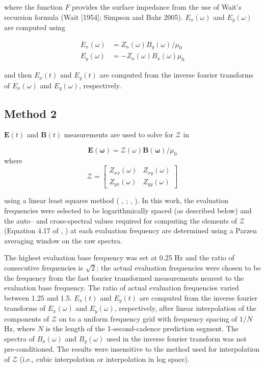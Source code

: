 \documentclass[linenumbers,draft]{agujournal}
\newcommand{\citeay}[1]{%
\citeauthor{#1}, \citeyear{#1}%
}
\begin{document}
\noindent where the function $F$ provides the surface impedance from the use of Wait's recursion formula (Wait [1954]; Simpson and Bahr 2005). $E_x(\omega)$ and $E_y(\omega)$ are computed using

\begin{equation}
\begin{split}
E_x(\omega) & = Z_n(\omega)B_y(\omega)/\mu_0\\
E_y(\omega) & = -Z_n(\omega)B_x(\omega)\mu_0
\end{split}
\end{equation}

\noindent and then $E_x(t)$ and $E_y(t)$ are computed from the inverse fourier transforms of $E_x(\omega)$ and $E_y(\omega)$, respectively.

\subsection{Method 2}

$\mathbf{E}(t)$ and $\mathbf{B}(t)$ measurements are used to solve for $\mathcal{Z}$ in

\begin{equation}
\mathbf{E(\omega)} = \mathcal{Z(\omega)}\mathbf{B(\omega)}/\mu_0
\end{equation}
\noindent where
\begin{equation}
\mathcal{Z} = 
\begin{bmatrix}
Z_{xx}(\omega) & Z_{xy}(\omega)\\
Z_{yx}(\omega) & Z_{yy}(\omega)
\end{bmatrix}
\end{equation}

\noindent using a linear least squares method (\citeay{Sims1971}; \citeay{Simpson2005}).  In this work, the evaluation frequencies were selected to be logarithmically spaced (as described below) and the auto-- and cross-spectral values required for computing the elements of $\mathcal{Z}$ (Equation 4.17 of \citeay{Simpson2005}) at each evaluation frequency are determined using a Parzen averaging window on the raw spectra. 

The highest evaluation base frequency was set at 0.25 Hz and the ratio of consecutive frequencies is $\sqrt{2}$; the actual evaluation frequencies were chosen to be the frequency from the fast fourier transformed measurements nearest to the evaluation base frequency. The ratio of actual evaluation frequencies varied between 1.25 and 1.5.  $E_x(t)$ and $E_y(t)$ are computed from the inverse fourier transforms of $E_x(\omega)$ and $E_y(\omega)$, respectively, after linear interpolation of the components of $\mathcal{Z}$ on to a uniform frequency grid with frequency spacing of $1/N$ Hz, where $N$ is the length of the 1-second-cadence prediction segment.  The spectra of $B_x(\omega)$ and $B_y(\omega)$ used in the inverse fourier transform was not pre-conditioned.  The results were insensitive to the method used for interpolation of $\mathcal{Z}$ (i.e., cubic interpolation or interpolation in log space).
\end{document}
